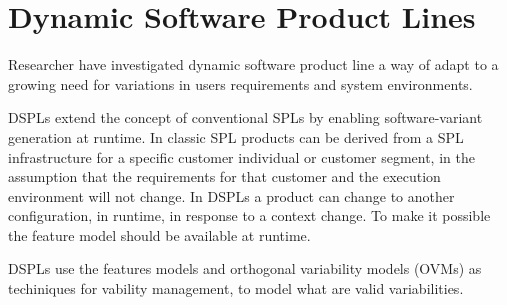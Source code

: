 \section{Dynamic Software Product Lines}
Researcher have investigated dynamic software product line a way of adapt to a growing need for variations in users requirements and system environments.

DSPLs extend the concept of conventional SPLs by enabling software-variant generation at runtime. In classic SPL products can be derived from a SPL infrastructure for a specific customer individual or customer segment, in the assumption that the requirements for that customer and the execution environment will not change. In DSPLs a product can change to another configuration, in runtime, in response to a context change. To make it possible the feature model should be available at runtime. \cite{bencomo_view_2012}

DSPLs use the features models and  orthogonal variability models (OVMs)
 as techiniques for vability management, to model what are valid variabilities.
